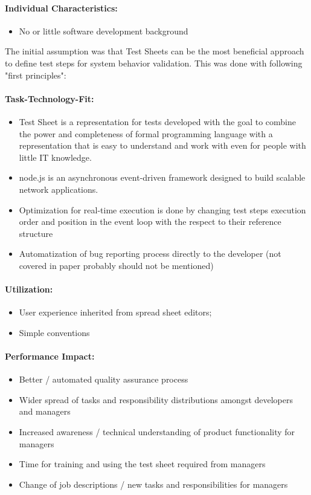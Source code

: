 \paragraph{Individual Characteristics:}
\begin{itemize}
	\item  No or little software development background
\end{itemize}


The initial assumption was that Test Sheets can be the most beneficial approach to define test steps for system behavior validation. This was done with following "first principles":
\paragraph{Task-Technology-Fit:}
\begin{itemize}
	\item Test Sheet is a representation for tests developed with the goal to combine the power and completeness of formal programming language with a representation that is easy to understand and work with even for people with little IT knowledge\cite{ts}.
	\item node.js is an asynchronous event-driven framework designed to build scalable network applications.
	\item Optimization for real-time execution is done by changing test steps execution order and position in the event loop with the respect to their reference structure
	\item Automatization of bug reporting process directly to the developer (not covered in paper probably should not be mentioned)
\end{itemize}

\paragraph{Utilization:}
\begin{itemize}
	\item User experience inherited from spread sheet editors;
	\item Simple conventions
\end{itemize}

\paragraph{Performance Impact:}
\begin{itemize}
	\item Better / automated quality assurance process
	\item Wider spread of tasks and responsibility distributions amongst developers and managers
	\item Increased awareness / technical understanding of product functionality for managers 
	\item Time for training and using the test sheet required from managers
	\item Change of job descriptions / new tasks and responsibilities for managers
\end{itemize}

